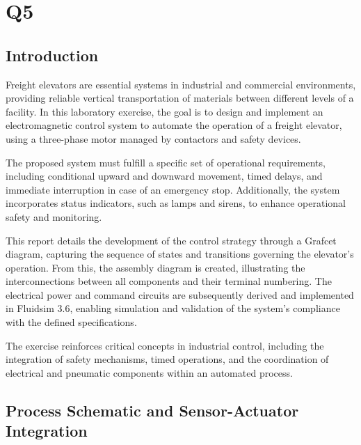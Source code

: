\section{Q5} 

\subsection{Introduction} \label{sec:Introduction}

Freight elevators are essential systems in industrial and commercial environments, providing reliable 
vertical transportation of materials between different levels of a facility. In this laboratory exercise, 
the goal is to design and implement an electromagnetic control system to automate the operation of a freight 
elevator, using a three-phase motor managed by contactors and safety devices.

The proposed system must fulfill a specific set of operational requirements, including conditional 
upward and downward movement, timed delays, and immediate interruption in case of an emergency stop. 
Additionally, the system incorporates status indicators, such as lamps and sirens, to enhance operational 
safety and monitoring.

This report details the development of the control strategy through a Grafcet diagram, capturing the 
sequence of states and transitions governing the elevator’s operation. From this, the assembly diagram 
is created, illustrating the interconnections between all components and their terminal numbering. The 
electrical power and command circuits are subsequently derived and implemented in Fluidsim 3.6, enabling 
simulation and validation of the system’s compliance with the defined specifications.

The exercise reinforces critical concepts in industrial control, including the integration of safety 
mechanisms, timed operations, and the coordination of electrical and pneumatic components within an 
automated process.

\subsection{Process Schematic and Sensor-Actuator Integration} \label{sec:Process_Schematic_and_Sensor-Actuator_Integration}


